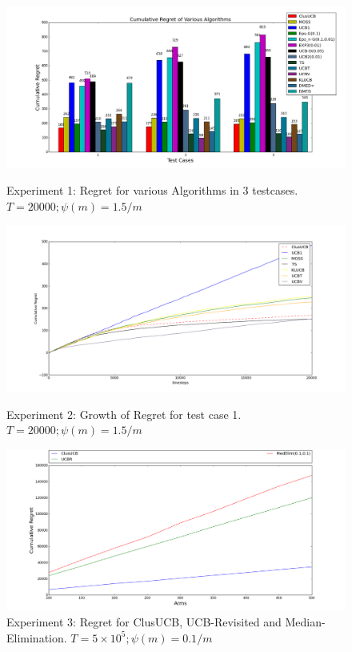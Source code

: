 \begin{figure}[!tbp]
\centering
\begin{minipage}[b]{0.4\textwidth}
\includegraphics[width=\textwidth]{img/cl_final1.png}
\caption{Experiment 1: Regret for various Algorithms in 3 testcases. $T=20000; \psi(m)=1.5/m$}
\end{minipage}
\hspace{0.1em}
\begin{minipage}[b]{0.4\textwidth}
\includegraphics[width=\textwidth]{img/cl_final2.png}
\caption{Experiment 2: Growth of Regret for test case 1. $T=20000; \psi(m)=1.5/m$}
\end{minipage}
\hspace{0.1em}
\begin{minipage}[b]{0.4\textwidth}
\includegraphics[width=\textwidth]{img/cl_final3.png}
\caption{Experiment 3: Regret for ClusUCB, UCB-Revisited and Median-Elimination. $T=5\times10^5; \psi(m)=0.1/m$}
\end{minipage}
\hspace{0.1em}
\end{figure}

